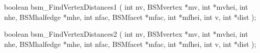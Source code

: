 \begin{listingC}
boolean bsm_FindVertexDistances1 ( int nv, BSMvertex *mv, int *mvhei,
                                   int nhe, BSMhalfedge *mhe,
                                   int nfac, BSMfacet *mfac, int *mfhei,
                                   int v, int *dist );
\end{listingC}

\begin{listingC}
boolean bsm_FindVertexDistances2 ( int nv, BSMvertex *mv, int *mvhei,
                                   int nhe, BSMhalfedge *mhe,
                                   int nfac, BSMfacet *mfac, int *mfhei,
                                   int v, int *dist );
\end{listingC}



